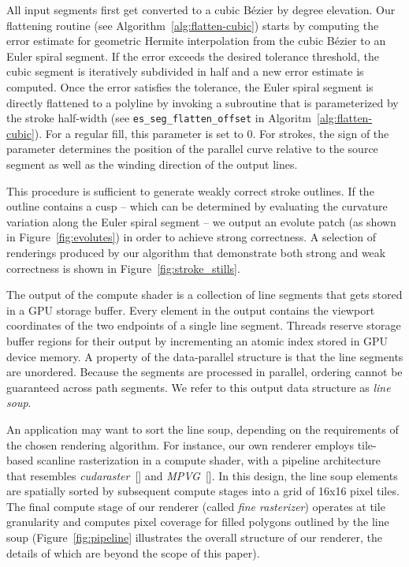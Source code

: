 \documentclass[sigconf, nonacm]{acmart}
\begin{document}
All input segments first get converted to a cubic Bézier by degree elevation. Our flattening routine (see Algorithm~\ref{alg:flatten-cubic}) starts by computing the error estimate for geometric Hermite interpolation from the cubic Bézier to an Euler spiral segment. If the error exceeds the desired tolerance threshold, the cubic segment is iteratively subdivided in half and a new error estimate is computed. Once the error satisfies the tolerance, the Euler spiral segment is directly flattened to a polyline by invoking a subroutine that is parameterized by the stroke half-width (see \texttt{es\_seg\_flatten\_offset} in Algoritm~\ref{alg:flatten-cubic}). For a regular fill, this parameter is set to $0$. For strokes, the sign of the parameter determines the position of the parallel curve relative to the source segment as well as the winding direction of the output lines.

This procedure is sufficient to generate weakly correct stroke outlines. If the outline contains a cusp -- which can be determined by evaluating the curvature variation along the Euler spiral segment -- we output an evolute patch (as shown in Figure~\ref{fig:evolutes}) in order to achieve strong correctness. A selection of renderings produced by our algorithm that demonstrate both strong and weak correctness is shown in Figure~\ref{fig:stroke_stills}.

The output of the compute shader is a collection of line segments that gets stored in a GPU storage buffer. Every element in the output contains the viewport coordinates of the two endpoints of a single line segment. Threads reserve storage buffer regions for their output by incrementing an atomic index stored in GPU device memory. A property of the data-parallel structure is that the line segments are unordered. Because the segments are processed in parallel, ordering cannot be guaranteed across path segments. We refer to this output data structure as \emph{line soup}.

An application may want to sort the line soup, depending on the requirements of the chosen rendering algorithm. For instance, our own renderer employs tile-based scanline rasterization in a compute shader, with a pipeline architecture that resembles \emph{cudaraster}~[] and \emph{MPVG}~[]. In this design, the line soup elements are spatially sorted by subsequent compute stages into a grid of 16x16 pixel tiles. The final compute stage of our renderer (called \emph{fine rasterizer}) operates at tile granularity and computes pixel coverage for filled polygons outlined by the line soup (Figure~\ref{fig:pipeline} illustrates the overall structure of our renderer, the details of which are beyond the scope of this paper).
\end{document}
